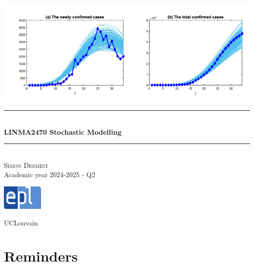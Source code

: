 \documentclass[12pt, openany]{report}
\newcommand{\HRule}{\rule{\linewidth}{0.5mm}}
\theoremstyle{definition}
\begin{document}
\begin{titlepage}
    \begin{sffamily}
    \begin{center}
        \includegraphics[scale=0.25]{img/page_de_garde.png} \\[1cm]
        \HRule \\[0.4cm]
        { \huge \bfseries LINMA2470 Stochastic Modelling \\[0.4cm] }
    
        \HRule \\[1.5cm]
        \textsc{\LARGE Simon Desmidt}\\[1cm]
        \vfill
        \vspace{2cm}
        {\large Academic year 2024-2025 - Q2}
        \vspace{0.4cm}
         
        \includegraphics[width=0.15\textwidth]{img/epl.png}
        
        UCLouvain\\
    
    \end{center}
    \end{sffamily}
\end{titlepage}

\setcounter{tocdepth}{1}
\tableofcontents
\chapter{Reminders}
\end{document}
